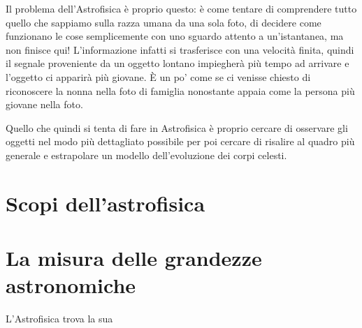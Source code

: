        Il problema dell'Astrofisica è proprio questo: è come tentare di comprendere tutto quello che sappiamo sulla razza umana da una sola foto, di decidere come funzionano le cose semplicemente con uno sguardo attento a un'istantanea, ma non finisce qui! L'informazione infatti si trasferisce con una velocità finita, quindi il segnale proveniente da un oggetto lontano impiegherà più tempo ad arrivare e l'oggetto ci apparirà più giovane. È un po' come se ci venisse chiesto di riconoscere la nonna nella foto di famiglia nonostante appaia come la persona più giovane nella foto.

        Quello che quindi si tenta di fare in Astrofisica è proprio cercare di osservare gli oggetti nel modo più dettagliato possibile per poi cercare di risalire al quadro più generale e estrapolare un modello dell'evoluzione dei corpi celesti.
    \section{Scopi dell'astrofisica}
    \section{La misura delle grandezze astronomiche}
        L'Astrofisica trova la sua